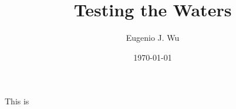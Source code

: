 \documentclass[12pt]{article}
\title{Testing the Waters}
\author{Eugenio J. Wu}
\date{\today}
\begin{document}
\maketitle \pagebreak

\tableofcontents \pagebreak

This is 
\end{document}
